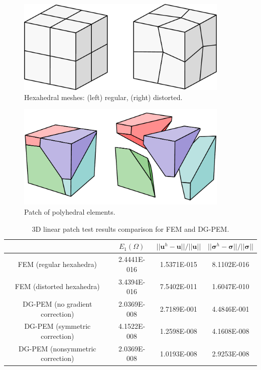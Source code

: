 \begin{figure}[!h]
    \centering
    \includegraphics[width=4.0in]{figures/hexahedral_patch_meshes.pdf}
    	\caption{Hexahedral meshes: (left) regular, (right) distorted.}
    \label{fig:hexahedral_patch_meshes}
\end{figure}

\begin{figure}[!h]
    \centering
    \includegraphics[width=4.0in]{figures/polyhedral_patch_mesh.pdf}
    	\caption{Patch of polyhedral elements.}
    \label{fig:polyhedral_patch_mesh}
\end{figure}

\begin{table}[!ht]
  \begin{center}
    \begin{tabular}{| c || c | c | c |}
    \hline
           & $E_1 (\Omega)$ & $||\mathbf{u}^h - \mathbf{u}|| / ||\mathbf{u}||$ & $||\boldsymbol{\sigma}^h - \boldsymbol{\sigma}|| / ||\boldsymbol{\sigma}||$ \\ \hline \hline
    FEM (regular hexahedra) & 2.4441E-016 & 1.5371E-015 & 8.1102E-016 \\ \hline
    FEM (distorted hexahedra) & 3.4394E-016 & 7.5402E-011 & 1.6047E-010 \\ \hline
    DG-PEM (no gradient correction) & 2.0369E-008 & 2.7189E-001 & 4.4846E-001 \\ \hline
    DG-PEM (symmetric correction) & 4.1522E-008 & 1.2598E-008 & 4.1608E-008 \\ \hline
    DG-PEM (nonsymmetric correction) & 2.0369E-008 & 1.0193E-008 & 2.9253E-008 \\
    \hline
    \end{tabular}
    \caption{3D linear patch test results comparison for FEM and DG-PEM.}
    \vspace{-5pt}
    \label{tab:linear_patch_test_3d}
    \vspace{-10pt}
  \end{center}
\end{table}

